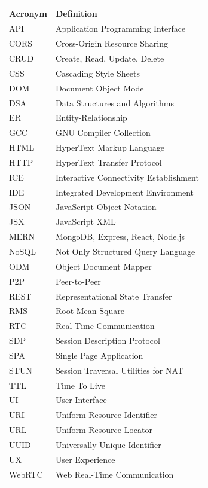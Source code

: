 \documentclass[12pt,a4paper,oneside]{report}
\newenvironment{reporttable}{%
  \small\singlespacing
}{%
  \doublespacing
}
\begin{document}
\begin{reporttable}
\begin{tabular}{@{} l p{10cm} @{}}
\toprule
\textbf{Acronym} & \textbf{Definition} \\
\midrule
API & Application Programming Interface \\
CORS & Cross-Origin Resource Sharing \\
CRUD & Create, Read, Update, Delete \\
CSS & Cascading Style Sheets \\
DOM & Document Object Model \\
DSA & Data Structures and Algorithms \\
ER & Entity-Relationship \\
GCC & GNU Compiler Collection \\
HTML & HyperText Markup Language \\
HTTP & HyperText Transfer Protocol \\
ICE & Interactive Connectivity Establishment \\
IDE & Integrated Development Environment \\
JSON & JavaScript Object Notation \\
JSX & JavaScript XML \\
MERN & MongoDB, Express, React, Node.js \\
NoSQL & Not Only Structured Query Language \\
ODM & Object Document Mapper \\
P2P & Peer-to-Peer \\
REST & Representational State Transfer \\
RMS & Root Mean Square \\
RTC & Real-Time Communication \\
SDP & Session Description Protocol \\
SPA & Single Page Application \\
STUN & Session Traversal Utilities for NAT \\
TTL & Time To Live \\
UI & User Interface \\
URI & Uniform Resource Identifier \\
URL & Uniform Resource Locator \\
UUID & Universally Unique Identifier \\
UX & User Experience \\
WebRTC & Web Real-Time Communication \\
\bottomrule
\end{tabular}
\end{reporttable}
\end{document}
